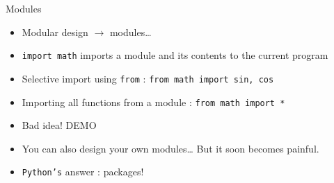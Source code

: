 \documentclass[presentation]{beamer}
\begin{document}
\begin{frame}[label={sec:org604b3c9},fragile]{Modules}

\begin{itemize}
\item Modular design \(\rightarrow\) modules\ldots{}
\item \texttt{import math} imports a module and its contents to the current program
\item Selective import using \texttt{from} : \texttt{from math import sin, cos}
\item Importing all functions from a module : \texttt{from math import *}
\item Bad idea! \alert{DEMO}
\item You can also design your own modules\ldots{} But it soon becomes painful.
\item \texttt{Python's} answer : packages!
\end{itemize}
\end{frame}
\end{document}
